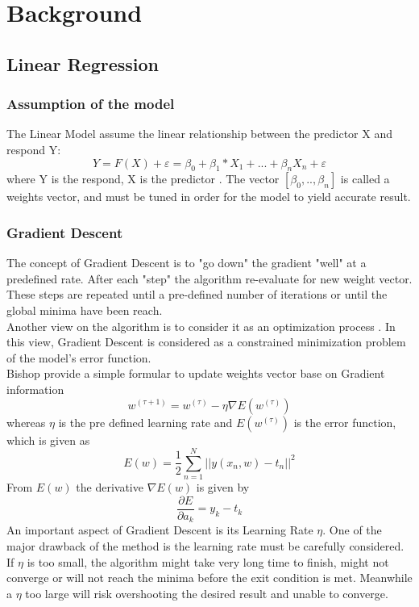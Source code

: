 \documentclass[11pt]{article}
\begin{document}
\section{Background}
\subsection{Linear Regression}
\subsubsection{Assumption of the model}
The Linear Model assume the linear relationship between the predictor X and respond Y:
\begin{equation*}
    Y=F(X)+\varepsilon=\beta_0 + \beta_1*X_1 + ... + \beta_n X_n + \varepsilon
\end{equation*}
where Y is the respond, X is the predictor \cite{james_introduction_2013}. The vector $[\beta_0, .. , \beta_n]$ is called a weights vector, and must be tuned in order for the model to yield accurate result.
\subsubsection{Gradient Descent}
The concept of Gradient Descent is to "go down" the gradient "well" at a predefined rate. After each "step" the algorithm re-evaluate for new weight vector. These steps are repeated until a pre-defined number of iterations or until the global minima have been reach. \cite{bishop_pattern_2006}\\
Another view on the algorithm is to consider it as an optimization process \cite{lecun_theoretical_1992}. In this view, Gradient Descent is considered as a constrained minimization problem of the model's error function.\\
Bishop \cite[p240]{bishop_pattern_2006} provide a simple formular to update weights vector base on Gradient information
\begin{equation}
w^{(\tau+1)} = w^{(\tau)} - \eta \nabla E (w^{(\tau)})
\end{equation}
whereas $\eta$ is the pre defined learning rate and $E (w^{(\tau)})$ is the error function, which is given as
\begin{equation}
E(w) = \frac{1}{2} \sum_{n=1}^N || y(x_n,w)-t_n||^2
\end{equation}
From $E(w)$ the derivative $\nabla E(w)$ is given by
\begin{equation}
\frac{\partial E}{\partial a_k} = y_k - t_k
\end{equation}
An important aspect of Gradient Descent is its Learning Rate $\eta$. One of the major drawback of the method is the learning rate must be carefully considered. If $\eta$ is too small, the algorithm might take very long time to finish, might not converge or will not reach the minima before the exit condition is met. Meanwhile a $\eta$ too large will risk overshooting the desired result and unable to converge.
\end{document}
